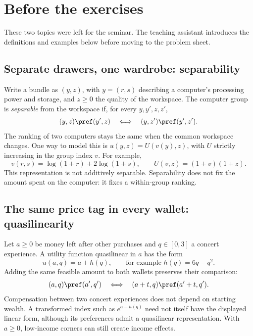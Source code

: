 \section*{Before the exercises}
These two topics were left for the seminar. The teaching assistant introduces the definitions and examples below before moving to the problem sheet.
\subsection*{Separate drawers, one wardrobe: separability}
Write a bundle as $(y,z)$, with $y=(r,s)$ describing a computer's processing power and storage, and $z\ge0$ the quality of the workspace. The computer group is \emph{separable} from the workspace if, for every $y,y',z,z'$,
\[
 (y,z)\pref(y',z)\quad\Longleftrightarrow\quad(y,z')\pref(y',z').
\]
The ranking of two computers stays the same when the common workspace changes. One way to model this is $u(y,z)=U(v(y),z)$, with $U$ strictly increasing in the group index $v$. For example,
\[
 v(r,s)=\log(1+r)+2\log(1+s),\qquad U(v,z)=(1+v)(1+z).
\]
This representation is not additively separable. Separability does not fix the amount spent on the computer: it fixes a within-group ranking.
\subsection*{The same price tag in every wallet: quasilinearity}
Let $a\ge0$ be money left after other purchases and $q\in[0,3]$ a concert experience. A utility function quasilinear in $a$ has the form
\[
 u(a,q)=a+h(q),\qquad\text{for example }h(q)=6q-q^2.
\]
Adding the same feasible amount to both wallets preserves their comparison:
\[
 (a,q)\pref(a',q')\quad\Longleftrightarrow\quad
 (a+t,q)\pref(a'+t,q').
\]
Compensation between two concert experiences does not depend on starting wealth. A transformed index such as $e^{a+h(q)}$ need not itself have the displayed linear form, although its preferences admit a quasilinear representation. With $a\ge0$, low-income corners can still create income effects.

\clearpage

